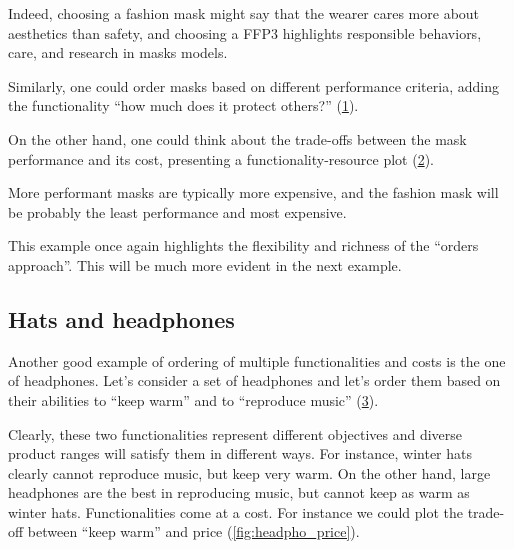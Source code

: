 Indeed, choosing a fashion mask might say that the wearer cares more about aesthetics than safety, and choosing a FFP3 highlights responsible behaviors, care, and research in masks models.

Similarly, one could order masks based on different performance criteria, adding the functionality ``how much does it protect others?'' (\cref{fig:masks_others}).

\begin{figure}[h!]
	\centering
	\caption{}
	\label{fig:masks_others}
\end{figure}

On the other hand, one could think about the trade-offs between the mask performance and its cost, presenting a functionality-resource plot (\cref{fig:masks_price}).

\begin{figure}[h!]
	\centering
	\caption{}
	\label{fig:masks_price}
\end{figure}

More performant masks are typically more expensive, and the fashion mask will be probably the least performance and most expensive.

This example once again highlights the flexibility and richness of the ``orders approach''.
This will be much more evident in the next example.


\subsection{Hats and headphones}
Another good example of ordering of multiple functionalities and costs is the one of headphones.
Let's consider a set of headphones and let's order them based on their abilities to ``keep warm'' and to ``reproduce music'' (\cref{fig:headpho_fun}).

\begin{figure}[h!]
	\centering
	\caption{}
	\label{fig:headpho_fun}
\end{figure}

Clearly, these two functionalities represent different objectives and diverse product ranges will satisfy them in different ways.
For instance, winter hats clearly cannot reproduce music, but keep very warm.
On the other hand, large headphones are the best in reproducing music, but cannot keep as warm as winter hats.
Functionalities come at a cost.
For instance we could plot the trade-off between ``keep warm'' and price (\cref{fig:headpho_price}).

